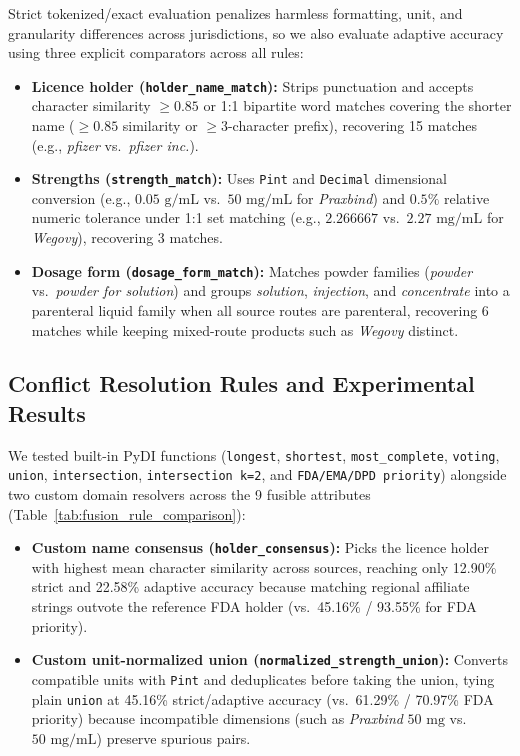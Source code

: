 \documentclass{llncs}
\begin{document}
Strict tokenized/exact evaluation penalizes harmless formatting, unit, and granularity differences across jurisdictions, so we also evaluate adaptive accuracy using three explicit comparators across all rules:
\begin{itemize}
  \item \textbf{Licence holder (\texttt{holder\_name\_match}):} Strips punctuation and accepts character similarity $\ge 0.85$ or 1:1 bipartite word matches covering the shorter name ($\ge 0.85$ similarity or $\ge 3$-character prefix), recovering 15 matches (e.g., \textit{pfizer} vs.\ \textit{pfizer inc.}).
  \item \textbf{Strengths (\texttt{strength\_match}):} Uses \texttt{Pint} and \texttt{Decimal} dimensional conversion (e.g., $0.05\text{ g/mL}$ vs.\ $50\text{ mg/mL}$ for \textit{Praxbind}) and $0.5\%$ relative numeric tolerance under 1:1 set matching (e.g., $2.266667$ vs.\ $2.27\text{ mg/mL}$ for \textit{Wegovy}), recovering 3 matches.
  \item \textbf{Dosage form (\texttt{dosage\_form\_match}):} Matches powder families (\textit{powder} vs.\ \textit{powder for solution}) and groups \textit{solution}, \textit{injection}, and \textit{concentrate} into a parenteral liquid family when all source routes are parenteral, recovering 6 matches while keeping mixed-route products such as \textit{Wegovy} distinct.
\end{itemize}

\subsection{Conflict Resolution Rules and Experimental Results}
We tested built-in PyDI functions (\texttt{longest}, \texttt{shortest}, \texttt{most\_complete}, \texttt{voting}, \texttt{union}, \texttt{intersection}, \texttt{intersection k=2}, and \texttt{FDA/EMA/DPD priority}) alongside two custom domain resolvers across the 9 fusible attributes (Table~\ref{tab:fusion_rule_comparison}):
\begin{itemize}
  \item \textbf{Custom name consensus (\texttt{holder\_consensus}):} Picks the licence holder with highest mean character similarity across sources, reaching only 12.90\% strict and 22.58\% adaptive accuracy because matching regional affiliate strings outvote the reference FDA holder (vs.\ 45.16\% / 93.55\% for FDA priority).
  \item \textbf{Custom unit-normalized union (\texttt{normalized\_strength\_union}):} Converts compatible units with \texttt{Pint} and deduplicates before taking the union, tying plain \texttt{union} at 45.16\% strict/adaptive accuracy (vs.\ 61.29\% / 70.97\% FDA priority) because incompatible dimensions (such as \textit{Praxbind} $50\text{ mg}$ vs.\ $50\text{ mg/mL}$) preserve spurious pairs.
\end{itemize}
\end{document}
